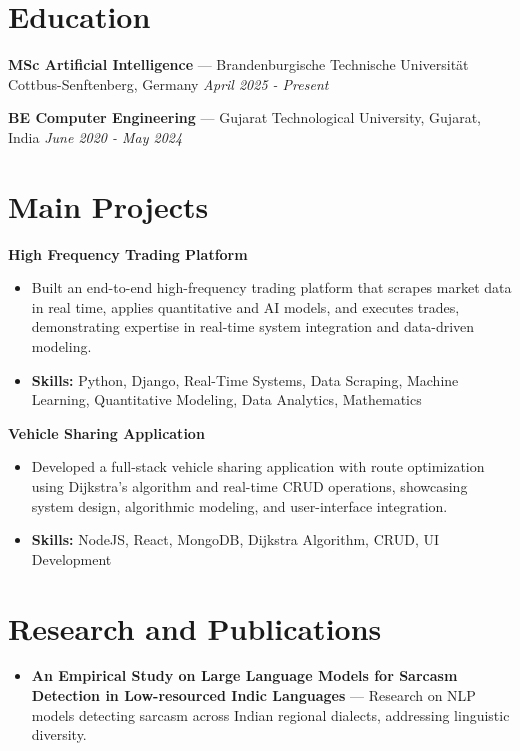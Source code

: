 \documentclass[a4paper,10pt]{article}
\begin{document}
\section*{Education}
\textbf{MSc Artificial Intelligence} — Brandenburgische Technische Universität Cottbus-Senftenberg, Germany \hfill \textit{April 2025 - Present}\par
\vspace{1.5pt}
\textbf{BE Computer Engineering} — Gujarat Technological University, Gujarat, India \hfill \textit{June 2020 - May 2024}\par

\section*{Main Projects}
\textbf{High Frequency Trading Platform}\par
\vspace{1pt}
\begin{itemize}
  \item Built an end-to-end high-frequency trading platform that scrapes market data in real time, applies quantitative and AI models, and executes trades, demonstrating expertise in real-time system integration and data-driven modeling.
  \item \textbf{Skills:} Python, Django, Real-Time Systems, Data Scraping, Machine Learning, Quantitative Modeling, Data Analytics, Mathematics
\end{itemize}
\vspace{3pt}
\textbf{Vehicle Sharing Application}\par
\vspace{1pt}
\begin{itemize}
  \item Developed a full-stack vehicle sharing application with route optimization using Dijkstra's algorithm and real-time CRUD operations, showcasing system design, algorithmic modeling, and user-interface integration.
  \item \textbf{Skills:} NodeJS, React, MongoDB, Dijkstra Algorithm, CRUD, UI Development
\end{itemize}

\section*{Research and Publications}
\begin{itemize}
\item \textbf{An Empirical Study on Large Language Models for Sarcasm Detection in Low-resourced Indic Languages} — Research on NLP models detecting sarcasm across Indian regional dialects, addressing linguistic diversity.
\end{itemize}
\end{document}
